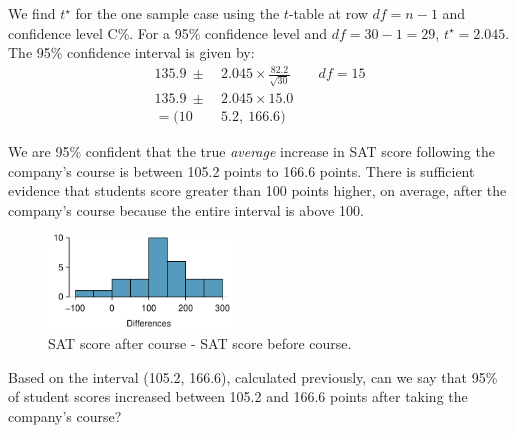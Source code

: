 \begin{examplewrap}
\begin{nexample}
\begin{description}
We find $t^{\star}$ for the one sample case using the $t$-table at row $df = n -1$ and confidence level C\%.  For a 95\% confidence level and $df = 30 - 1 = 29$, $t^{\star} = 2.045$.\\

The 95\% confidence interval is given by:
\begin{align*}
135.9 \ \pm\  &2.045\times  \frac{82.2}{\sqrt{30}}  \qquad df = 15\\
135.9 \ \pm\  &2.045\times 15.0 \\
=(10&5.2,\ 166.6)
\end{align*}
\item[\inferencestep{Conclude}]  We are 95\% confident that the true \emph{average} increase in SAT score following the company's course is between 105.2 points to 166.6 points.  There is sufficient evidence that students score greater than 100 points higher, on average, after the company's course because the entire interval is above 100.  
\end{description}
\end{nexample}
\end{examplewrap}


\begin{figure}
\centering
\includegraphics[width=0.45\textwidth]{ch_inference_for_means/figures/satImprovementHTDataHistogram/satImprovementHTDataHistogram}
\caption{SAT score after course - SAT score before course. }
\label{satImprovementHTDataHistogram3}
\end{figure}


\begin{exercisewrap}
\begin{nexercise}
Based on the interval (105.2, 166.6), calculated previously, can we say that 95\% of student scores increased between 105.2 and 166.6 points after taking the company's course?  


\end{nexercise}
\end{exercisewrap}


